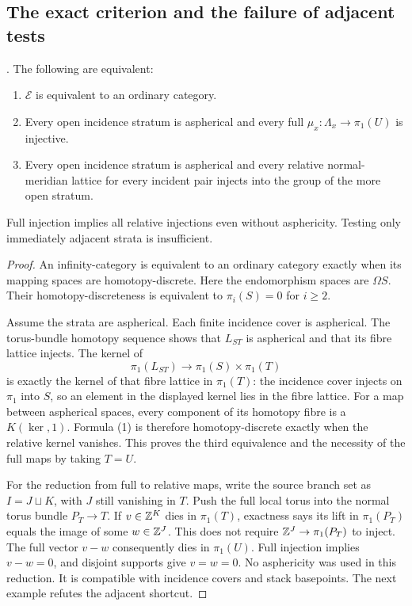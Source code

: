 \subsection{The exact criterion and the failure of adjacent tests}

\begin{theorem}\label{P1b1}
. The following are equivalent:
\begin{enumerate}
\item $\mathcal E$ is equivalent to an ordinary category.
\item Every open incidence stratum is aspherical and every full
      $\mu_x:\Lambda_x\to\pi_1(U)$ is injective.
\item Every open incidence stratum is aspherical and every relative
      normal-meridian lattice for every incident pair injects into
      the group of the more open stratum.
\end{enumerate}
Full injection implies all relative injections even without
asphericity. Testing only immediately adjacent strata is insufficient.
\end{theorem}
\begin{proof}
An infinity-category is equivalent to an ordinary category
exactly when its mapping spaces are homotopy-discrete.
Here the endomorphism spaces are $\Omega S$. Their
homotopy-discreteness is equivalent to $\pi_i(S)=0$ for $i\ge2$.

Assume the strata are aspherical. Each finite incidence cover
is aspherical. The torus-bundle homotopy sequence shows that
$L_{ST}$ is aspherical and that its fibre lattice injects.
The kernel of
\[
 \pi_1(L_{ST})\longrightarrow\pi_1(S)\times\pi_1(T)
\]
is exactly the kernel of that fibre lattice in $\pi_1(T)$:
the incidence cover injects on $\pi_1$ into $S$, so an
element in the displayed kernel lies in the fibre lattice.
For a map between aspherical spaces, every component of
its homotopy fibre is a $K(\ker,1)$. Formula (1) is
therefore homotopy-discrete exactly when the relative
kernel vanishes. This proves the third equivalence and
the necessity of the full maps by taking $T=U$.

For the reduction from full to relative maps, write the
source branch set as $I=J\sqcup K$, with $J$ still
vanishing in $T$. Push the full local torus into the
normal torus bundle $P_T\to T$. If $v\in\mathbb Z^K$ dies
in $\pi_1(T)$, exactness says its lift in $\pi_1(P_T)$
equals the image of some $w\in\mathbb Z^J$. This does not
require $\mathbb Z^J\to\pi_1(P_T)$ to inject.
The full vector $v-w$ consequently dies in $\pi_1(U)$.
Full injection implies $v-w=0$, and disjoint supports
give $v=w=0$. No asphericity was used in this reduction.
It is compatible with incidence covers and stack basepoints.
The next example refutes the adjacent shortcut.
\end{proof}

